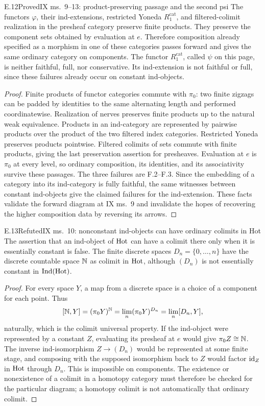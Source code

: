 \begin{claim}{E.12}{Proved}{IX ms.~9--13: product-preserving passage and the second psi}
The functors $\varphi$, their ind-extensions, restricted Yoneda $R_1^{\mathrm{cat}}$, and filtered-colimit realization in the presheaf category preserve finite products. They preserve the component sets obtained by evaluation at $e$. Therefore composition already specified as a morphism in one of these categories passes forward and gives the same ordinary category on components. The functor $R_1^{\mathrm{cat}}$, called $\psi$ on this page, is neither faithful, full, nor conservative. Its ind-extension is not faithful or full, since these failures already occur on constant ind-objects.
\end{claim}
\begin{proof}
Finite products of functor categories commute with $\pi_0$: two finite zigzags can be padded by identities to the same alternating length and performed coordinatewise. Realization of nerves preserves finite products up to the natural weak equivalence. Products in an ind-category are represented by pairwise products over the product of the two filtered index categories. Restricted Yoneda preserves products pointwise. Filtered colimits of sets commute with finite products, giving the last preservation assertion for presheaves. Evaluation at $e$ is $\pi_0$ at every level, so ordinary composition, its identities, and its associativity survive these passages. The three failures are F.2--F.3. Since the embedding of a category into its ind-category is fully faithful, the same witnesses between constant ind-objects give the claimed failures for the ind-extension. These facts validate the forward diagram at IX ms.~9 and invalidate the hopes of recovering the higher composition data by reversing its arrows.
\end{proof}

\begin{claim}{E.13}{Refuted}{IX ms.~10: nonconstant ind-objects can have ordinary colimits in Hot}
The assertion that an ind-object of $\mathrm{Hot}$ can have a colimit there only when it is essentially constant is false. The finite discrete spaces $D_n=\{0,\ldots,n\}$ have the discrete countable space $\mathbb N$ as colimit in $\mathrm{Hot}$, although $(D_n)$ is not essentially constant in $\operatorname{Ind}(\mathrm{Hot})$.
\end{claim}
\begin{proof}
For every space $Y$, a map from a discrete space is a choice of a component for each point. Thus
\[
 [\mathbb N,Y]=(\pi_0Y)^{\mathbb N}=\lim_n(\pi_0Y)^{D_n}=\lim_n[D_n,Y],
\]
naturally, which is the colimit universal property. If the ind-object were represented by a constant $Z$, evaluating its presheaf at $e$ would give $\pi_0Z\cong\mathbb N$. The inverse ind-isomorphism $Z\to(D_n)$ would be represented at some finite stage, and composing with the supposed isomorphism back to $Z$ would factor $\mathrm{id}_Z$ in $\mathrm{Hot}$ through $D_n$. This is impossible on components. The existence or nonexistence of a colimit in a homotopy category must therefore be checked for the particular diagram; a homotopy colimit is not automatically that ordinary colimit.
\end{proof}

